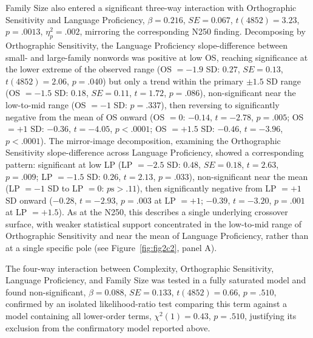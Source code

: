 \documentclass[utf8]{FrontiersinHarvard} %
\begin{document}
	Family Size also entered a significant three-way interaction with Orthographic Sensitivity and Language Proficiency, $\beta = 0.216$, $SE = 0.067$, $t(4852) = 3.23$, $p = .0013$, $\eta^2_p = .002$, mirroring the corresponding N250 finding. Decomposing by Orthographic Sensitivity, the Language Proficiency slope-difference between small- and large-family nonwords was positive at low OS, reaching significance at the lower extreme of the observed range (OS $= -1.9$ SD: $0.27$, $SE = 0.13$, $t(4852) = 2.06$, $p = .040$) but only a trend within the primary $\pm 1.5$ SD range (OS $= -1.5$ SD: $0.18$, $SE = 0.11$, $t = 1.72$, $p = .086$), non-significant near the low-to-mid range (OS $= -1$ SD: $p = .337$), then reversing to significantly negative from the mean of OS onward (OS $= 0$: $-0.14$, $t = -2.78$, $p = .005$; OS $= +1$ SD: $-0.36$, $t = -4.05$, $p < .0001$; OS $= +1.5$ SD: $-0.46$, $t = -3.96$, $p < .0001$). The mirror-image decomposition, examining the Orthographic Sensitivity slope-difference across Language Proficiency, showed a corresponding pattern: significant at low LP (LP $= -2.5$ SD: $0.48$, $SE = 0.18$, $t = 2.63$, $p = .009$; LP $= -1.5$ SD: $0.26$, $t = 2.13$, $p = .033$), non-significant near the mean (LP $= -1$ SD to LP $= 0$: $p\text{s} > .11$), then significantly negative from LP $= +1$ SD onward ($-0.28$, $t = -2.93$, $p = .003$ at LP $= +1$; $-0.39$, $t = -3.20$, $p = .001$ at LP $= +1.5$). As at the N250, this describes a single underlying crossover surface, with weaker statistical support concentrated in the low-to-mid range of Orthographic Sensitivity and near the mean of Language Proficiency, rather than at a single specific pole (see Figure~\ref{fig:fig2c2}, panel A).

	The four-way interaction between Complexity, Orthographic Sensitivity, Language Proficiency, and Family Size was tested in a fully saturated model and found non-significant, $\beta = 0.088$, $SE = 0.133$, $t(4852) = 0.66$, $p = .510$, confirmed by an isolated likelihood-ratio test comparing this term against a model containing all lower-order terms, $\chi^2(1) = 0.43$, $p = .510$, justifying its exclusion from the confirmatory model reported above.
\end{document}
